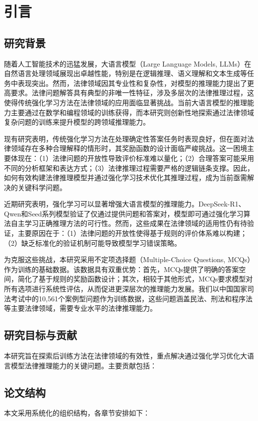 \documentclass{pkuthesis}
\begin{document}
\section{引言}
\subsection{研究背景}
随着人工智能技术的迅猛发展，大语言模型（Large Language Models, LLMs）在自然语言处理领域展现出卓越性能，特别是在逻辑推理、语义理解和文本生成等任务中表现突出。然而，法律领域因其专业性和复杂性，对模型的推理能力提出了更高要求。法律问题解答具有典型的非唯一性特征，涉及多层次的法律推理过程，这使得传统强化学习方法在法律领域的应用面临显著挑战。当前大语言模型的推理能力主要通过在数学和编程领域的训练获得，而本研究则创新性地探索通过法律领域复杂问题的训练来提升模型的跨领域推理能力。

现有研究表明，传统强化学习方法在处理确定性答案任务时表现良好，但在面对法律领域存在多种合理解释的情形时，其奖励函数的设计面临严峻挑战。这一困境主要体现在：（1）法律问题的开放性导致评价标准难以量化；（2）合理答案可能采用不同的分析框架和表达方式；（3）法律推理过程需要严格的逻辑链条支撑。因此，如何有效构建法律推理模型并通过强化学习技术优化其推理过程，成为当前亟需解决的关键科学问题。

近期研究表明，强化学习可以显著增强大语言模型的推理能力。DeepSeek-R1\cite{guo2025deepseek}、Qwen\cite{yang2024qwen2}和Seed系列模型\cite{seed2025seed}验证了仅通过提供问题和答案对，模型即可通过强化学习算法自主学习正确推理方法的可行性。然而，这些成果在法律领域的适用性仍有待验证，主要原因在于：（1）法律问题的开放性使得基于规则的评价体系难以构建；（2）缺乏标准化的验证机制可能导致模型学习错误策略。

为克服这些挑战，本研究采用不定项选择题（Multiple-Choice Questions, MCQs）作为训练的基础数据。该数据具有双重优势：首先，MCQs提供了明确的答案空间，简化了基于规则的奖励函数设计；其次，相较于其他形式，MCQs要求模型对所有选项进行系统性评估，从而促进更深层次的推理能力发展。我们以中国国家司法考试中的10,561个案例型问题作为训练数据，这些问题涵盖民法、刑法和程序法等主要法律领域，需要专业水平的法律推理能力。

\subsection{研究目标与贡献}
本研究旨在探索后训练方法在法律领域的有效性，重点解决通过强化学习优化大语言模型法律推理能力的关键问题。主要贡献包括：


\subsection{论文结构}
本文采用系统化的组织结构，各章节安排如下：
\end{document}
